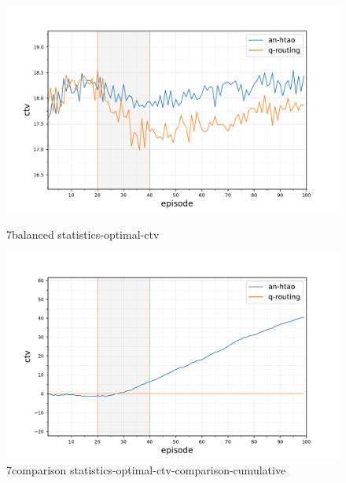 \begin{figure}[ht]
	\begin{minipage}{.49\textwidth}
		\centering
		\includegraphics[width=1.0\linewidth,trim={25pt 0pt 50pt 0pt},clip]{7balanced_statistics-optimal-ctv}
		\captionsetup{labelfont=bf,singlelinecheck=on}
		\caption{7balanced statistics-optimal-ctv}
		\label{fig:7balancedstatistics-optimal-ctv}
\end{minipage}
\begin{minipage}{.49\textwidth}
	\centering
	\includegraphics[width=1.0\linewidth,trim={25pt 0pt 50pt 0pt},clip]{7comparison_statistics-optimal-ctv-comparison-cumulative}
	\captionsetup{labelfont=bf,singlelinecheck=on}
	\caption{7comparison statistics-optimal-ctv-comparison-cumulative}
	\label{fig:7comparison_statistics-optimal-ctv-comparison-cumulative}
\end{minipage}\hfill%
\end{figure}

